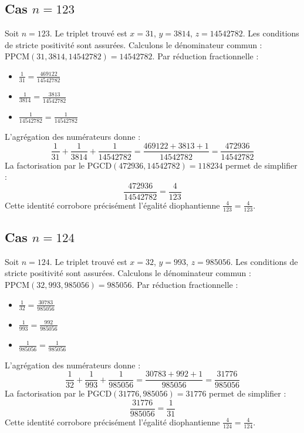 \documentclass[11pt,a4paper]{article}
\begin{document}
\subsection{Cas $n = 123$}
Soit $n = 123$. Le triplet trouvé est $x = 31$, $y = 3814$, $z = 14542782$.
Les conditions de stricte positivité sont assurées.
Calculons le dénominateur commun : $\text{PPCM}(31, 3814, 14542782) = 14542782$.
Par réduction fractionnelle :
\begin{itemize}
    \item $\frac{1}{31} = \frac{469122}{14542782}$
    \item $\frac{1}{3814} = \frac{3813}{14542782}$
    \item $\frac{1}{14542782} = \frac{1}{14542782}$
\end{itemize}
L'agrégation des numérateurs donne :
$$ \frac{1}{31} + \frac{1}{3814} + \frac{1}{14542782} = \frac{469122 + 3813 + 1}{14542782} = \frac{472936}{14542782} $$
La factorisation par le $\text{PGCD}(472936, 14542782) = 118234$ permet de simplifier :
$$ \frac{472936}{14542782} = \frac{4}{123} $$
Cette identité corrobore précisément l'égalité diophantienne $\frac{4}{123} = \frac{4}{123}$.

\subsection{Cas $n = 124$}
Soit $n = 124$. Le triplet trouvé est $x = 32$, $y = 993$, $z = 985056$.
Les conditions de stricte positivité sont assurées.
Calculons le dénominateur commun : $\text{PPCM}(32, 993, 985056) = 985056$.
Par réduction fractionnelle :
\begin{itemize}
    \item $\frac{1}{32} = \frac{30783}{985056}$
    \item $\frac{1}{993} = \frac{992}{985056}$
    \item $\frac{1}{985056} = \frac{1}{985056}$
\end{itemize}
L'agrégation des numérateurs donne :
$$ \frac{1}{32} + \frac{1}{993} + \frac{1}{985056} = \frac{30783 + 992 + 1}{985056} = \frac{31776}{985056} $$
La factorisation par le $\text{PGCD}(31776, 985056) = 31776$ permet de simplifier :
$$ \frac{31776}{985056} = \frac{1}{31} $$
Cette identité corrobore précisément l'égalité diophantienne $\frac{4}{124} = \frac{4}{124}$.
\end{document}
